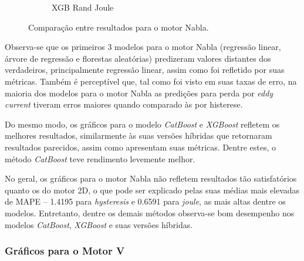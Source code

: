\documentclass{article}
\begin{document}
\begin{figure}[!htbp]
\begin{subfigure}[b]{0.23\textwidth}
        \caption{XGB Rand Joule}
    \end{subfigure}
    \hfill
    \begin{subfigure}[b]{0.23\textwidth}
        \centering
        \null
    \end{subfigure}
    
    \caption{Comparação entre resultados para o motor Nabla.}
\end{figure}

Observa-se que os primeiros 3 modelos para o motor Nabla (regressão linear, árvore de regressão e florestas aleatórias) predizeram valores distantes dos verdadeiros, principalmente regressão linear, assim como foi refletido por suas métricas. Também é perceptível que, tal como foi visto em suas taxas de erro, na maioria dos modelos para o motor Nabla as predições para perda por \textit{eddy current} tiveram erros maiores quando comparado às por histerese.

Do mesmo modo, os gráficos para o modelo \textit{CatBoost} e \textit{XGBoost} refletem os melhores resultados, similarmente às suas versões híbridas que retornaram resultados parecidos, assim como apresentam suas métricas. Dentre estes, o método \textit{CatBoost} teve rendimento levemente melhor.

No geral, os gráficos para o motor Nabla não refletem resultados tão satisfatórios quanto os do motor 2D, o que pode ser explicado pelas suas médias mais elevadas de MAPE \--- 1.4195 para \textit{hysteresis} e 0.6591 para \textit{joule}, as mais altas dentre os modelos. Entretanto, dentre os demais métodos observa-se bom desempenho nos modelos \textit{CatBoost}, \textit{XGBoost} e suas versões híbridas.

\newpage

\subsubsection{Gráficos para o Motor V}
\end{document}
